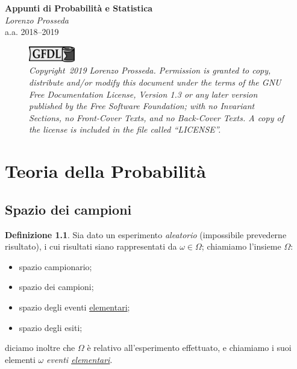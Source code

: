 \documentclass[12pt,openany]{amsbook}
\theoremstyle{plain}
\numberwithin{equation}{section} %
\theoremstyle{definition}
\newtheorem{defn}[thm]{Definizione}
\begin{document}
    \begin{titlepage}
        \centering %
        \Huge\textbf{Appunti di Probabilità e Statistica}\\
        \Large\textit{Lorenzo Prosseda}\\
        \bigskip
        \large a.a. 2018\---2019 \\
        \begin{figure}[h] %
            \includegraphics[width=2cm]{gfdl-logo.pdf}
            \bigskip \\
            \small\textit{Copyright \textcopyright\,2019 Lorenzo Prosseda. Permission is granted to copy, distribute and/or modify this document under the terms of the GNU Free Documentation License, Version 1.3 or any later version published by the Free Software Foundation; with no Invariant Sections, no Front-Cover Texts, and no Back-Cover Texts. A copy of the license is included in the file called ``LICENSE''.}
        \end{figure}
    \end{titlepage}

    \tableofcontents

    \chapter{Teoria della Probabilità}
        \section{Spazio dei campioni}
            \begin{defn}
                Sia dato un esperimento \textit{aleatorio} (impossibile prevederne risultato), i cui risultati siano rappresentati da $\omega \in \Omega$; chiamiamo l'insieme $\Omega$:
                \begin{itemize}
                    \item spazio campionario;
                    \item spazio dei campioni;
                    \item spazio degli eventi \underline{elementari};
                    \item spazio degli esiti;
                \end{itemize}
                diciamo inoltre che $\Omega$ è relativo all'esperimento effettuato, e chiamiamo i suoi elementi $\omega$ \textit{eventi \underline{elementari}}.
            \end{defn}
\end{document}
